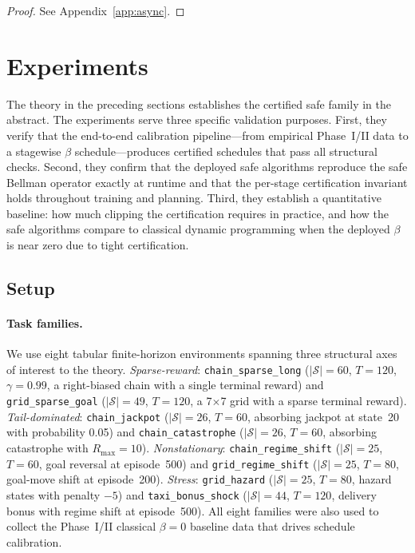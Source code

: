 \documentclass{article}
\theoremstyle{remark}
\begin{document}
\begin{proof}
See Appendix~\ref{app:async}.
\end{proof}

\clearpage
\section{Experiments}
\label{sec:experiments}

The theory in the preceding sections establishes the certified safe family in the abstract.
The experiments serve three specific validation purposes.
First, they verify that the end-to-end calibration pipeline---from empirical Phase~I/II data to a stagewise $\beta$ schedule---produces certified schedules that pass all structural checks.
Second, they confirm that the deployed safe algorithms reproduce the safe Bellman operator exactly at runtime and that the per-stage certification invariant holds throughout training and planning.
Third, they establish a quantitative baseline: how much clipping the certification requires in practice, and how the safe algorithms compare to classical dynamic programming when the deployed $\beta$ is near zero due to tight certification.

\subsection{Setup}
\label{sec:exp-setup}

\paragraph{Task families.}
We use eight tabular finite-horizon environments spanning three structural axes of interest to the theory.
\emph{Sparse-reward}: \texttt{chain\_sparse\_long} ($|\mathcal{S}|=60$, $T=120$, $\gamma=0.99$, a right-biased chain with a single terminal reward) and \texttt{grid\_sparse\_goal} ($|\mathcal{S}|=49$, $T=120$, a 7$\times$7 grid with a sparse terminal reward).
\emph{Tail-dominated}: \texttt{chain\_jackpot} ($|\mathcal{S}|=26$, $T=60$, absorbing jackpot at state~20 with probability 0.05) and \texttt{chain\_catastrophe} ($|\mathcal{S}|=26$, $T=60$, absorbing catastrophe with $R_{\max}=10$).
\emph{Nonstationary}: \texttt{chain\_regime\_shift} ($|\mathcal{S}|=25$, $T=60$, goal reversal at episode~500) and \texttt{grid\_regime\_shift} ($|\mathcal{S}|=25$, $T=80$, goal-move shift at episode~200).
\emph{Stress}: \texttt{grid\_hazard} ($|\mathcal{S}|=25$, $T=80$, hazard states with penalty $-5$) and \texttt{taxi\_bonus\_shock} ($|\mathcal{S}|=44$, $T=120$, delivery bonus with regime shift at episode~500).
All eight families were also used to collect the Phase~I/II classical $\beta=0$ baseline data that drives schedule calibration.
\end{document}
